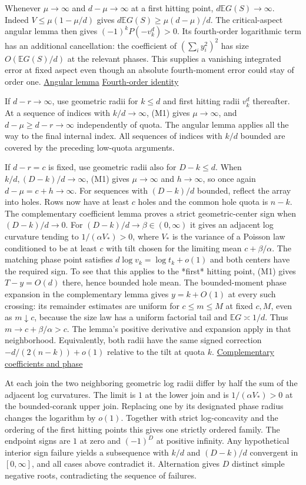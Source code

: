 Whenever $\mu\to\infty$ and $d-\mu\to\infty$ at a first hitting point, $d\mathbb E G(S)\to\infty$. Indeed $V\le\mu(1-\mu/d)$ gives $d\mathbb E G(S)\ge\mu(d-\mu)/d$. The critical-aspect angular lemma then gives $(-1)^kP(-v_k^d)>0$. Its fourth-order logarithmic term has an additional cancellation: the coefficient of $(\sum_i y_i^2)^2$ has size $O(\mathbb E G(S)/d)$ at the relevant phases. This supplies a vanishing integrated error at fixed aspect even though an absolute fourth-moment error could stay of order one. \hyperref[sec:critical-aspect-angular-nodes]{Angular lemma} \enspace \hyperref[sec:fourth-transverse-cumulant]{Fourth-order identity}

If $d-r\to\infty$, use geometric radii for $k\le d$ and first hitting radii $v_k^d$ thereafter. At a sequence of indices with $k/d\to\infty$, (M1) gives $\mu\to\infty$, and $d-\mu\ge d-r\to\infty$ independently of quota. The angular lemma applies all the way to the final internal index. All sequences of indices with $k/d$ bounded are covered by the preceding low-quota arguments.

If $d-r=c$ is fixed, use geometric radii also for $D-k\le d$. When $k/d,(D-k)/d\to\infty$, (M1) gives $\mu\to\infty$ and $h\to\infty$, so once again $d-\mu=c+h\to\infty$. For sequences with $(D-k)/d$ bounded, reflect the array into holes. Rows now have at least $c$ holes and the common hole quota is $n-k$. The complementary coefficient lemma proves a strict geometric-center sign when $(D-k)/d\to0$. For $(D-k)/d\to\beta\in(0,\infty)$ it gives an adjacent log curvature tending to $1/(\alpha V_*)>0$, where $V_*$ is the variance of a Poisson law conditioned to be at least $c$ with tilt chosen for the limiting mean $c+\beta/\alpha$. The matching phase point satisfies $d\log v_k=\log t_k+o(1)$ and both centers have the required sign. To see that this applies to the *first* hitting point, (M1) gives $T-y=O(d)$ there, hence bounded hole mean. The bounded-moment phase expansion in the complementary lemma gives $y=k+O(1)$ at every such crossing: its remainder estimates are uniform for $c\le m\le M$ at fixed $c,M$, even as $m\downarrow c$, because the size law has a uniform factorial tail and $\mathbb E G\asymp1/d$. Thus $m\to c+\beta/\alpha>c$. The lemma's positive derivative and expansion apply in that neighborhood. Equivalently, both radii have the same signed correction $-d/(2(n-k))+o(1)$ relative to the tilt at quota $k$. \hyperref[sec:fixed-corank-critical-upper]{Complementary coefficients and phase}

At each join the two neighboring geometric log radii differ by half the sum of the adjacent log curvatures. The limit is $1$ at the lower join and is $1/(\alpha V_*)>0$ at the bounded-corank upper join. Replacing one by its designated phase radius changes the logarithm by $o(1)$. Together with strict log-concavity and the ordering of the first hitting points this gives one strictly ordered family. The endpoint signs are $1$ at zero and $(-1)^D$ at positive infinity. Any hypothetical interior sign failure yields a subsequence with $k/d$ and $(D-k)/d$ convergent in $[0,\infty]$, and all cases above contradict it. Alternation gives $D$ distinct simple negative roots, contradicting the sequence of failures.

